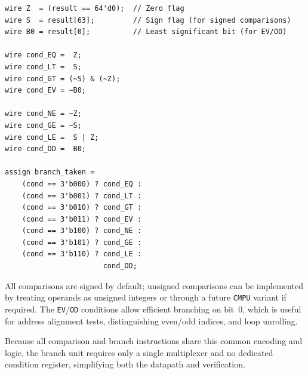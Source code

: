 \smallskip
\lstset{style=codesnippetstyle}
\begin{lstlisting}
wire Z  = (result == 64'd0);  // Zero flag
wire S  = result[63];         // Sign flag (for signed comparisons)
wire B0 = result[0];          // Least significant bit (for EV/OD)

wire cond_EQ =  Z;
wire cond_LT =  S;
wire cond_GT = (~S) & (~Z);
wire cond_EV = ~B0;

wire cond_NE = ~Z;
wire cond_GE = ~S;
wire cond_LE =  S | Z;
wire cond_OD =  B0;

assign branch_taken =
    (cond == 3'b000) ? cond_EQ :
    (cond == 3'b001) ? cond_LT :
    (cond == 3'b010) ? cond_GT :
    (cond == 3'b011) ? cond_EV :
    (cond == 3'b100) ? cond_NE :
    (cond == 3'b101) ? cond_GE :
    (cond == 3'b110) ? cond_LE :
                       cond_OD;
\end{lstlisting}

All comparisons are signed by default; unsigned comparisons can be implemented by treating operands as unsigned integers or through a future \texttt{CMPU} variant if required.  
The \texttt{EV}/\texttt{OD} conditions allow efficient branching on bit~0, which is useful for address alignment tests, distinguishing even/odd indices, and loop unrolling.

Because all comparison and branch instructions share this common encoding and logic, the branch unit requires only a single multiplexer and no dedicated condition register, simplifying both the datapath and verification.


